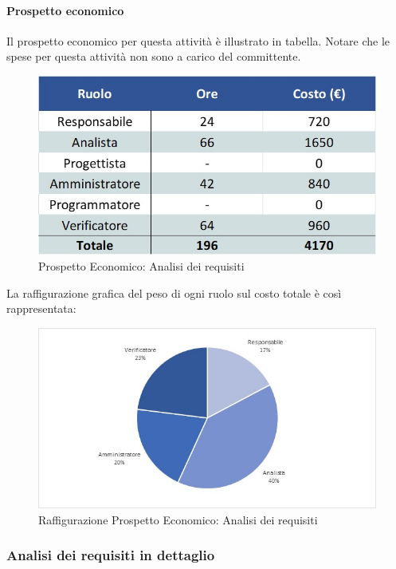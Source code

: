 \paragraph{Prospetto economico}
Il prospetto economico per questa attività è illustrato in tabella. Notare che le spese per questa attività non sono a carico del committente.
\begin{figure}[h!]
	\centerline{\includegraphics[scale=0.4]{img/Preventivo/AnalisiRequisiti.Economico.jpg}}
	\caption{Prospetto Economico: Analisi dei requisiti}
\end{figure}
La raffigurazione grafica del peso di ogni ruolo sul costo totale è così rappresentata: 
\begin{figure}[h!]
	\centerline{\includegraphics[scale=0.4]{img/Preventivo/Torte/AnalisiRequisiti.jpg}}
	\caption{Raffigurazione Prospetto Economico: Analisi dei requisiti}
\end{figure}

\subsubsection{Analisi dei requisiti in dettaglio}
